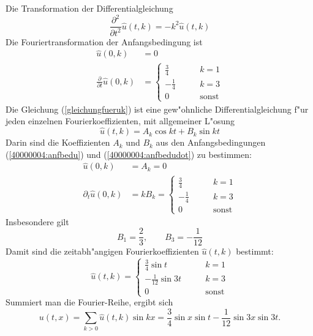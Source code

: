\begin{loesung}
Die Transformation der Differentialgleichung 
\begin{equation}
\frac{\partial^2}{\partial t^2}\hat u(t,k)
=-k^2\hat u(t,k)
\label{gleichungfueruk}
\end{equation}
Die Fouriertransformation der Anfangsbedingung ist
\begin{align}
\hat u(0,k)&=0\label{40000004:anfbedu}\\
\frac{\partial}{\partial t}\hat u(0,k)&=
\begin{cases}
\frac34&\qquad k= 1\\
-\frac14&\qquad k= 3\\
0&\qquad \text{sonst}
\end{cases}
\label{40000004:anfbedudot}
\end{align}
Die Gleichung
(\ref{gleichungfueruk})
ist eine gew"ohnliche Differentialgleichung f"ur jeden
einzelnen Fourierkoeffizienten, mit allgemeiner L"osung
\[
\hat u(t,k)=A_k\cos kt+B_k\sin kt
\]
Darin sind die Koeffizienten $A_k$ und $B_k$ aus den Anfangsbedingungen
(\ref{40000004:anfbedu}) und (\ref{40000004:anfbedudot}) zu bestimmen:
\begin{align*}
\hat u(0,k)&=A_k=0\\
\partial_t \hat u(0,k)&=kB_k=
\begin{cases}
\frac34&\qquad k= 1\\
-\frac14&\qquad k= 3\\
0&\qquad \text{sonst}
\end{cases}
\end{align*}
Insbesondere gilt
\[
B_1=\frac23,\qquad B_3=-\frac1{12}
\]
Damit sind die zeitabh"angigen Fourierkoeffizienten $\hat u(t,k)$ bestimmt:
\[
\hat u(t,k)=
\begin{cases}
\frac34\sin t &\qquad k= 1\\
-\frac1{12}\sin 3t&\qquad k= 3\\
0&\qquad \text{sonst}
\end{cases}
\]
Summiert man die Fourier-Reihe, ergibt sich
\[
u(t,x)=\sum_{k>0}\hat u(t,k) \sin kx
= \frac34\sin x \sin t -\frac1{12}\sin 3x \sin 3t.
\]
\end{loesung}
